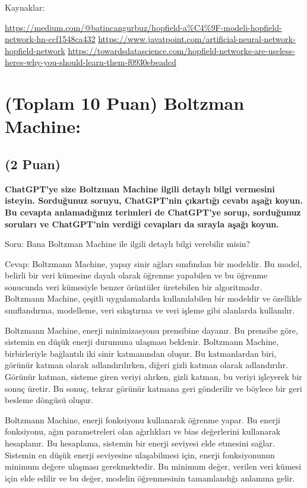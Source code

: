 \documentclass[11pt]{article}
\begin{document}
    Kaynaklar: 

    \url{https://medium.com/@batincangurbuz/hopfield-a%C4%9F-modeli-hopfield-network-hn-ccf1548ca432}
    \url{https://www.javatpoint.com/artificial-neural-network-hopfield-network}\newline
    \url{https://towardsdatascience.com/hopfield-networks-are-useless-heres-why-you-should-learn-them-f0930ebeadcd}
    

\section{(Toplam 10 Puan) Boltzman Machine:}

\subsection{(2 Puan)} \textbf{ChatGPT’ye size Boltzman Machine ilgili detaylı bilgi vermesini isteyin. Sorduğunuz soruyu, ChatGPT'nin çıkartığı cevabı aşağı koyun. Bu cevapta anlamadığınız terimleri de ChatGPT’ye sorup, sorduğunuz soruları ve ChatGPT’nin verdiği cevapları da sırayla aşağı koyun.}

Soru: Bana Boltzman Machine ile ilgili detaylı bilgi verebilir misin?

Cevap: Boltzmann Machine, yapay sinir ağları sınıfından bir modeldir. Bu model, belirli bir veri kümesine dayalı olarak öğrenme yapabilen ve bu öğrenme sonucunda veri kümesiyle benzer örüntüler üretebilen bir algoritmadır. Boltzmann Machine, çeşitli uygulamalarda kullanılabilen bir modeldir ve özellikle sınıflandırma, modelleme, veri sıkıştırma ve veri işleme gibi alanlarda kullanılır.

Boltzmann Machine, enerji minimizasyonu prensibine dayanır. Bu prensibe göre, sistemin en düşük enerji durumuna ulaşması beklenir. Boltzmann Machine, birbirleriyle bağlantılı iki sinir katmanından oluşur. Bu katmanlardan biri, görünür katman olarak adlandırılırken, diğeri gizli katman olarak adlandırılır. Görünür katman, sisteme giren veriyi alırken, gizli katman, bu veriyi işleyerek bir sonuç üretir. Bu sonuç, tekrar görünür katmana geri gönderilir ve böylece bir geri besleme döngüsü oluşur.

Boltzmann Machine, enerji fonksiyonu kullanarak öğrenme yapar. Bu enerji fonksiyonu, ağın parametreleri olan ağırlıkları ve bias değerlerini kullanarak hesaplanır. Bu hesaplama, sistemin bir enerji seviyesi elde etmesini sağlar. Sistemin en düşük enerji seviyesine ulaşabilmesi için, enerji fonksiyonunun minimum değere ulaşması gerekmektedir. Bu minimum değer, verilen veri kümesi için elde edilir ve bu değer, modelin öğrenmesinin tamamlandığı anlamına gelir.
\end{document}

